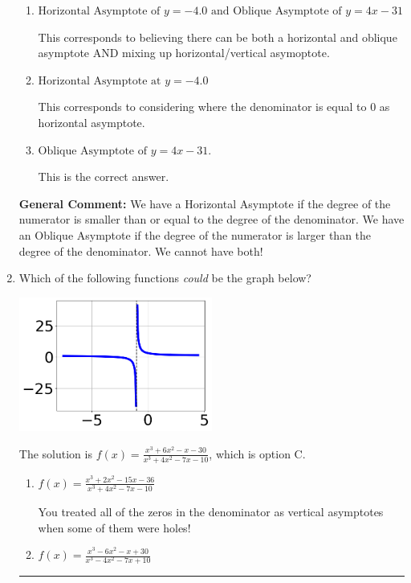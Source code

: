 \documentclass{extbook}[14pt]
\newcommand{\litem}[1]{\item #1

\rule{\textwidth}{0.4pt}}
\begin{document}
\begin{enumerate}
{\begin{enumerate}[label=\Alph*.]
This corresponds to using rule for Horizontal Asymptote when degree of numerator and denominator match.
\item \( \text{Horizontal Asymptote of } y = -4.0 \text{ and Oblique Asymptote of } y = 4x -31 \)

This corresponds to believing there can be both a horizontal and oblique asymptote AND mixing up horizontal/vertical asymoptote.
\item \( \text{Horizontal Asymptote at } y = -4.0 \)

This corresponds to considering where the denominator is equal to 0 as horizontal asymptote.
\item \( \text{Oblique Asymptote of } y = 4x -31. \)

This is the correct answer.
\end{enumerate}

\textbf{General Comment:} We have a Horizontal Asymptote if the degree of the numerator is smaller than or equal to the degree of the denominator. We have an Oblique Asymptote if the degree of the numerator is larger than the degree of the denominator. We cannot have both!
}
\litem{
Which of the following functions \textit{could} be the graph below?

\begin{center}
    \includegraphics[width=0.5\textwidth]{../Figures/identifyGraphOfRationalFunctionB.png}
\end{center}




The solution is \( f(x)=\frac{x^{3} +6 x^{2} -x -30}{x^{3} +4 x^{2} -7 x -10} \), which is option C.\begin{enumerate}[label=\Alph*.]
\item \( f(x)=\frac{x^{3} +2 x^{2} -15 x -36}{x^{3} +4 x^{2} -7 x -10} \)

You treated all of the zeros in the denominator as vertical asymptotes when some of them were holes!
\item \( f(x)=\frac{x^{3} -6 x^{2} -x + 30}{x^{3} -4 x^{2} -7 x + 10} \)


\end{enumerate}}
\end{enumerate}
\end{document}

